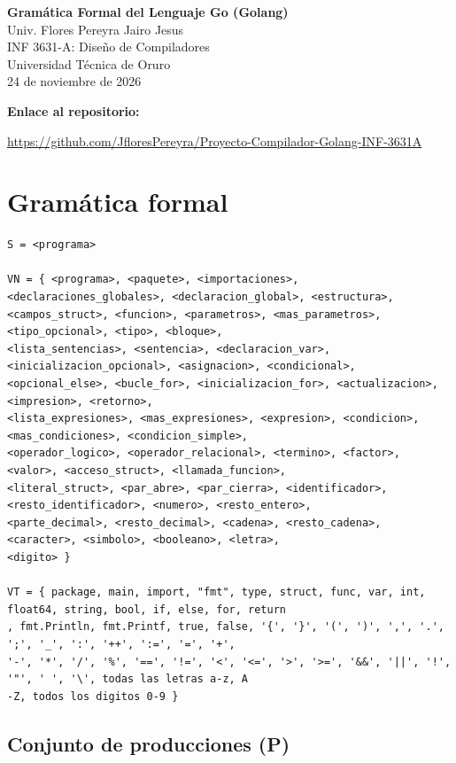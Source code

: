 \documentclass[11pt, a4paper]{article}
\begin{document}
\begin{center}
    {\Large\bfseries Gramática Formal del Lenguaje Go (Golang)}\\[0.6em]
    Univ. Flores Pereyra Jairo Jesus \\
    INF 3631-A: Diseño de Compiladores \\
    Universidad Técnica de Oruro \\[0.4em]
    24 de noviembre de 2026
\end{center}

\noindent\textbf{Enlace al repositorio:}\par
\noindent\raggedright{\small\url{https://github.com/JfloresPereyra/Proyecto-Compilador-Golang-INF-3631A}}

\section{Gramática formal}

\begin{lstlisting}[style=gramatica]
S = <programa>

VN = { <programa>, <paquete>, <importaciones>, <declaraciones_globales>, <declaracion_global>, <estructura>,
<campos_struct>, <funcion>, <parametros>, <mas_parametros>, <tipo_opcional>, <tipo>, <bloque>,
<lista_sentencias>, <sentencia>, <declaracion_var>, <inicializacion_opcional>, <asignacion>, <condicional>,
<opcional_else>, <bucle_for>, <inicializacion_for>, <actualizacion>, <impresion>, <retorno>,
<lista_expresiones>, <mas_expresiones>, <expresion>, <condicion>, <mas_condiciones>, <condicion_simple>,
<operador_logico>, <operador_relacional>, <termino>, <factor>, <valor>, <acceso_struct>, <llamada_funcion>,
<literal_struct>, <par_abre>, <par_cierra>, <identificador>, <resto_identificador>, <numero>, <resto_entero>,
<parte_decimal>, <resto_decimal>, <cadena>, <resto_cadena>, <caracter>, <simbolo>, <booleano>, <letra>,
<digito> }

VT = { package, main, import, "fmt", type, struct, func, var, int, float64, string, bool, if, else, for, return
, fmt.Println, fmt.Printf, true, false, '{', '}', '(', ')', ',', '.', ';', '_', ':', '++', ':=', '=', '+',
'-', '*', '/', '%', '==', '!=', '<', '<=', '>', '>=', '&&', '||', '!', '"', ' ', '\', todas las letras a-z, A
-Z, todos los digitos 0-9 }
\end{lstlisting}

\subsection*{Conjunto de producciones (P)}
\end{document}
